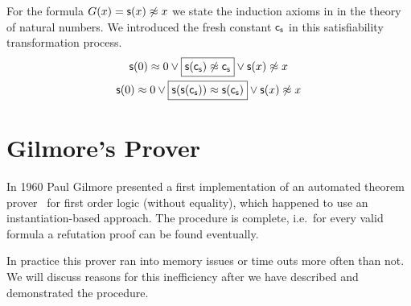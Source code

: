 \begin{example} For the formula \( G(x)=\mathsf{s}(x)\not\approx x \) we state the induction axioms in \CNF{} in the theory of natural numbers.
	We introduced the fresh constant \( \mathsf{c}_{\mathsf{s}} \) in this satisfiability transformation process.
	\begin{gather*}
	\mathsf{s}(0)\approx 0 \lor \boxed{\mathsf{s}(\mathsf{c}_{\mathsf{s}})\not\approx \mathsf{c}_{\mathsf{s}}} \lor \mathsf{s}(x)\not\approx x \\
	\mathsf{s}(0)\approx 0 \lor \boxed{\mathsf{s}(\mathsf{s}(\mathsf{c}_{\mathsf{s}}))\approx \mathsf{s}(\mathsf{c}_{\mathsf{s}})} \lor \mathsf{s}(x)\not\approx x
	\end{gather*}
\end{example}



\section{Gilmore's Prover}\label{sec:gilmore:prover}

In 1960 Paul Gilmore presented a first { implementation} of an automated
theorem prover~\cite{5392528} for first order logic (without equality),
which happened to use an instantiation-based approach.
The procedure is complete, i.e.~for every valid formula
a refutation proof can be found eventually.

In practice this prover ran into memory issues or time outs more often than not.
We will discuss reasons for this inefficiency after we have described and demonstrated the procedure.

